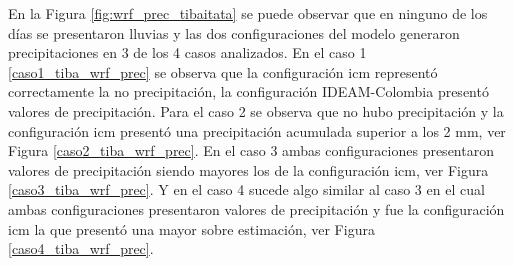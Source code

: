 En la Figura \ref{fig:wrf_prec_tibaitata} se puede observar que en ninguno de los días se presentaron lluvias y las dos configuraciones del modelo generaron precipitaciones en 3 de los 4 casos analizados. En el caso 1 \ref{caso1_tiba_wrf_prec} se observa que la configuración icm representó correctamente la no precipitación, la configuración IDEAM-Colombia presentó valores de precipitación. Para el caso 2 se observa que no hubo precipitación y la configuración icm presentó una precipitación acumulada superior a los 2 mm, ver Figura \ref{caso2_tiba_wrf_prec}. En el caso 3 ambas configuraciones presentaron valores de precipitación siendo mayores los de la configuración icm, ver Figura \ref{caso3_tiba_wrf_prec}. Y en el caso 4 sucede algo similar al caso 3 en el cual ambas configuraciones presentaron valores de precipitación y fue la configuración icm la que presentó una mayor sobre estimación, ver Figura \ref{caso4_tiba_wrf_prec}.\\



